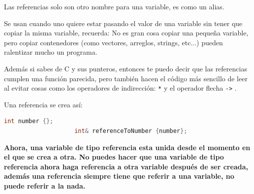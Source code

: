 \documentclass[12pt, fleqn]{report}                             %
\theoremstyle{break}                                            %
\newcommand{\textCode}[1]  { \texttt{#1} }                      %
\begin{document}
                Las referencias solo son otro nombre para una variable, es como un alias.

                Se usan cuando uno quiere estar pasando el valor de una variable sin tener que copiar la misma
                variable, recuerda: No es gran cosa copiar una pequeña variable, pero
                copiar contenedores (como vectores, arreglos, strings, etc...)
                pueden ralentizar mucho un programa.

                Además si sabes de C y sus punteros, entonces te puedo decir que las referencias
                cumplen una función parecida, pero también hacen el código más sencillo de leer
                al evitar cosas como los operadores de indirección: \textCode{*} y el operador flecha
                \textCode{->}.

                Una referencia se crea así:
                \begin{lstlisting}[language=C++, gobble=20]
                    int number {};
                    int& referenceToNumber {number};
                \end{lstlisting}

                \textbf{Ahora, una variable de tipo referencia esta unida desde el momento en el que se crea a otra.
                No puedes hacer que una variable de tipo referencia ahora haga referencia a otra variable después
                de ser creada, además una referencia siempre tiene que referir a una variable, no puede referir a
                la nada.}

                \clearpage
\end{document}
